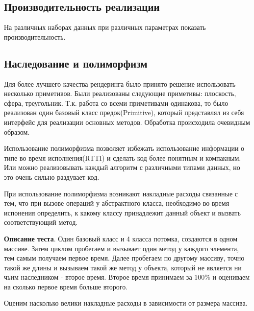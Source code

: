 \documentclass[12pt, a4paper, utf8]{article}
\begin{document}
\subsection{Производительность реализации}

На различных наборах данных при различных параметрах показать производительность.

\subsection{Наследование и полиморфизм}

Для более лучшего качества рендеринга было принято решение использовать несколько приметивов. Были реализованы следующие приметивы: плоскость, сфера, треугольник. Т.к. работа со всеми приметивами одинакова, то было реализован один базовый класс предок(Primitive), который представлял из себя интерфейс для реализации основных методов. Обработка происходила очевидным образом. 

Использование полиморфизма позволяет избежать использование информации о типе во время исполнения(RTTI) и сделать код более понятным и компакным. Или можно реализовывать каждый алгоритм с различными типами данных, но это очень сильно раздувает код.

При использование полиморфизма возникают накладные расходы связанные с тем, что при вызове операций у абстрактного класса, необходимо во время испонения определить, к какому классу принадлежит данный объект и вызвать соответствующий метод. 

\textbf{Описание теста}. Один базовый класс и 4 класса потомка, создаются в одном массиве. 
Затем циклом пробегаем и вызывает один метод у каждого элемента, тем самым получаем первое время.
Далее пробегаем по другому массиву, точно такой же длины и вызываем такой же метод у объекта, который не является ни чьим наследником - второе время.
Второе время принимаем за 100\% и оцениваем на сколько первое время больше второго. 

Оценим насколько велики накладные расходы в зависимости от размера массива.
\end{document}
